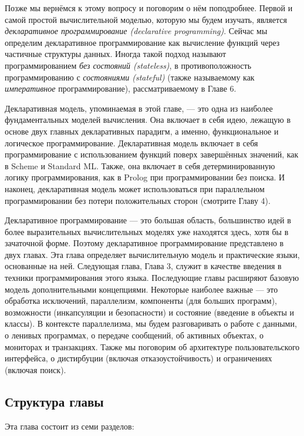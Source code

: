 Позже мы вернёмся к этому вопросу и поговорим о нём поподробнее. Первой и самой простой вычислительной моделью, которую мы будем изучать, является \emph{декларативное программирование (declarative programming)}. Сейчас мы определим декларативное программирование как вычисление функций через частичные структуры данных. Иногда такой подход называют программированием \emph{без состояний (stateless)}, в противоположность программированию с \emph{состояниями (stateful)} (также называемому как \emph{императивное} программирование), рассматриваемому в Главе 6.

Декларативная модель, упоминаемая в этой главе, --- это одна из наиболее фундаментальных моделей вычисления. Она включает в себя идею, лежащую в основе двух главных декларативных парадигм, а именно, функциональное и логическое программирование. Декларативная модель включает в себя программирование с использованием функций поверх завершённых значений, как в Scheme и Standard ML. Также, она включает в себя детерминированную логику программирования, как в Prolog при программировании без поиска. И наконец, декларативная модель может использоваться при параллельном программировании без потери положительных сторон (смотрите Главу 4).

Декларативное программирование --- это большая область, большинство идей в более выразительных вычислительных моделях уже находятся здесь, хотя бы в зачаточной форме. Поэтому декларативное программирование представлено в двух главах. Эта глава определяет вычислительную модель и практические языки, основанные на ней. Следующая глава, Глава 3, служит в качестве введения в техники программирования этого языка. Последующие главы расширяют базовую модель дополнительными концепциями. Некоторые наиболее важные --- это обработка исключений, параллелизм, компоненты (для больших программ), возможности (инкапсуляции и безопасности) и состояние (введение в объекты и классы). В контексте параллелизма, мы будем разговаривать о работе с данными, о ленивых программах, о передаче сообщений, об активных объектах, о мониторах и транзакциях. Также мы поговорим об архитектуре пользовательского интерфейса, о дистирбуции (включая отказоустойчивость) и ограничениях (включая поиск).

\subsection*{Структура главы}

Эта глава состоит из семи разделов:

